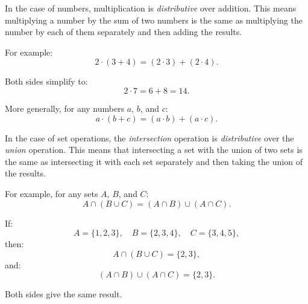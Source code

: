 \begin{example}
    In the case of numbers, multiplication is \textit{distributive} over addition. This means multiplying a number by the sum of two numbers is the same as multiplying the number by each of them separately and then adding the results.
    
    For example:
    \[
    2 \cdot (3 + 4) = (2 \cdot 3) + (2 \cdot 4).
    \]
    
    Both sides simplify to:
    \[
    2 \cdot 7 = 6 + 8 = 14.
    \]
    
    More generally, for any numbers \( a \), \( b \), and \( c \):
    \[
    a \cdot (b + c) = (a \cdot b) + (a \cdot c).
    \]
\end{example}

\begin{example}
    In the case of set operations, the \textit{intersection} operation is \textit{distributive} over the \textit{union} operation. This means that intersecting a set with the union of two sets is the same as intersecting it with each set separately and then taking the union of the results.
    
    For example, for any sets \( A \), \( B \), and \( C \):
    \[
    A \cap (B \cup C) = (A \cap B) \cup (A \cap C).
    \]
    
    If:
    \[
    A = \{1, 2, 3\}, \quad B = \{2, 3, 4\}, \quad C = \{3, 4, 5\},
    \]
    then:
    \[
    A \cap (B \cup C) = \{2, 3\},
    \]
    and:
    \[
    (A \cap B) \cup (A \cap C) = \{2, 3\}.
    \]
    
    Both sides give the same result.
\end{example}